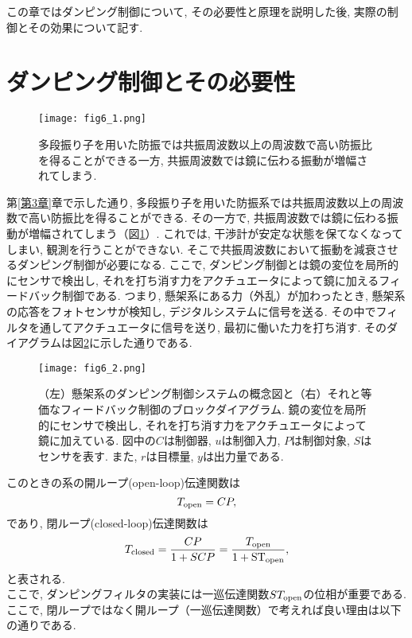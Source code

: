 この章ではダンピング制御について, その必要性と原理を説明した後, 実際の制御とその効果について記す. 
\section{ダンピング制御とその必要性}
\begin{figure}[H]
\begin{center}
\texttt{[image: fig6\_1.png]}
\caption[共振周波数における振動の増幅]{多段振り子を用いた防振では共振周波数以上の周波数で高い防振比を得ることができる一方, 共振周波数では鏡に伝わる振動が増幅されてしまう. }
\label{fig6.1}
\end{center}
\end{figure}
第\ref{第3章}章で示した通り, 多段振り子を用いた防振系では共振周波数以上の周波数で高い防振比を得ることができる. その一方で, 共振周波数では鏡に伝わる振動が増幅されてしまう（図\ref{fig6.1}）. これでは, 干渉計が安定な状態を保てなくなってしまい, 観測を行うことができない. そこで共振周波数において振動を減衰させるダンピング制御が必要になる. ここで, ダンピング制御とは鏡の変位を局所的にセンサで検出し, それを打ち消す力をアクチュエータによって鏡に加えるフィードバック制御である. つまり, 懸架系にある力（外乱）が加わったとき, 懸架系の応答をフォトセンサが検知し, デジタルシステムに信号を送る. その中でフィルタを通してアクチュエータに信号を送り, 最初に働いた力を打ち消す. そのダイアグラムは図\ref{fig6.2}に示した通りである. 
\begin{figure}[H]
\begin{center}
\texttt{[image: fig6\_2.png]}
\caption[ダンピング制御のダイアグラム]{（左）懸架系のダンピング制御システムの概念図と（右）それと等価なフィードバック制御のブロックダイアグラム. 鏡の変位を局所的にセンサで検出し, それを打ち消す力をアクチュエータによって鏡に加えている. 図中の$C$は制御器, $u$は制御入力, $P$は制御対象, $S$はセンサを表す. また, $r$は目標量, $y$は出力量である.}
\label{fig6.2}
\end{center}
\end{figure}
このときの系の開ループ(open-loop)伝達関数は
\begin{equation}
T_{\rm open}=CP,
\end{equation}
であり, 閉ループ(closed-loop)伝達関数は
\begin{equation}
T_{\rm closed}=\frac{CP}{1+SCP}=\frac{T_{\rm open}}{1+{\rm ST_{\rm open}}},
\end{equation}
と表される. \\
\quad ここで, ダンピングフィルタの実装には一巡伝達関数$ST_{\rm open}$の位相が重要である. ここで, 閉ループではなく開ループ（一巡伝達関数）で考えれば良い理由は以下の通りである. \\
